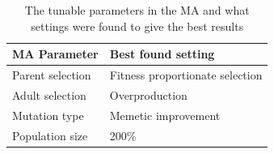 {
\begin{table}[tbph]
\centering
\begin{tabular}{ll}
\toprule
\textbf{MA Parameter} & \textbf{Best found setting}     \\ \midrule
Parent selection      & Fitness proportionate selection \\
Adult selection       & Overproduction                  \\
Mutation type         & Memetic improvement             \\
Population size       & 200\%                           \\ \bottomrule
\end{tabular}
\caption{The tunable parameters in the MA and what settings were found to give the best results}
\label{tab:parameter_table}
\end{table}
}

\cleardoublepage
